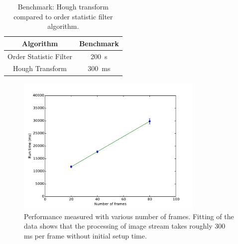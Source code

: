 \documentclass{article}
\begin{document}


\begin{table}[t]
\centering
\begin{tabular}{c c}
\hline
\textbf{Algorithm} & \textbf{Benchmark} \\
\hline
Order Statistic Filter & 200~s \\
Hough Transform & 300~ms \\
\hline
\end{tabular}
\caption{Benchmark: Hough transform compared to order statistic filter algorithm.}
\end{table}

\begin{figure} 
    \centering 
    \includegraphics[width=0.8\textwidth]{fig_bc}
\caption{Performance measured with various number of frames. Fitting of the
data shows that the processing of image stream takes roughly 300 ms per frame
without initial setup time.} 
\end{figure}
\end{document}
